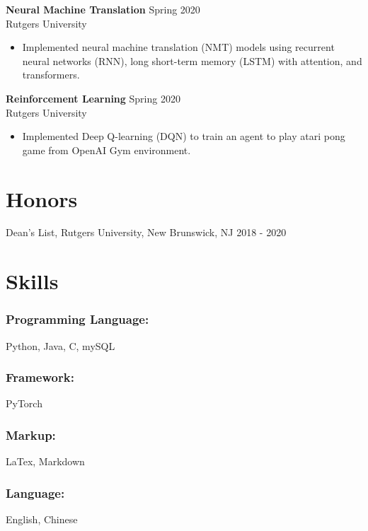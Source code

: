 \documentclass{article}
\begin{document}
\noindent \textbf{Neural Machine Translation}
\hfill{Spring 2020}\\
Rutgers University
\begin{itemize}
  \itemsep0em
  \item Implemented neural machine translation (NMT) models using recurrent neural networks (RNN), long short-term memory (LSTM) with attention, and transformers.
\end{itemize}

\noindent \textbf{Reinforcement Learning}
\hfill{Spring 2020}\\
Rutgers University
\begin{itemize}
  \itemsep0em
  \item Implemented Deep Q-learning (DQN) to train an agent to play atari pong game from OpenAI Gym environment.
\end{itemize}


\section{Honors}
Dean's List, Rutgers University, New Brunswick, NJ
\hfill{2018 - 2020}\\


\section{Skills}

\subsubsection{Programming Language:}

Python, Java, C, mySQL

\subsubsection{Framework:}

PyTorch

\subsubsection{Markup:}

LaTex, Markdown

\subsubsection{Language:}
English, Chinese
\end{document}
